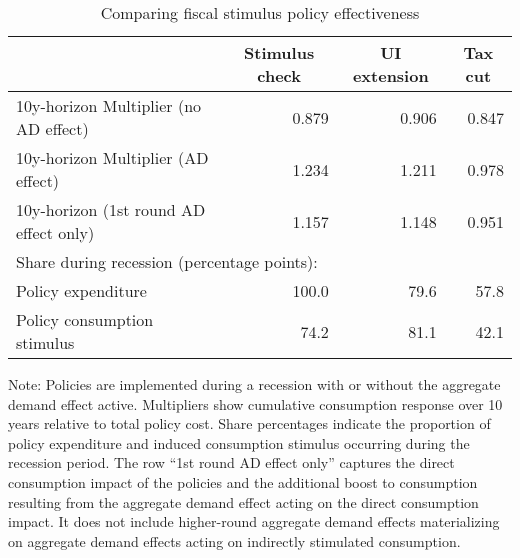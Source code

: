 \documentclass[\PathToRoot/\ProjectName]{subfiles}
\begin{document}
\begin{table}[tb] 
  \caption{Comparing fiscal stimulus policy effectiveness}
  \whenintegrated{\label{tab:Multiplier}} 
  \centering

  \begin{tabular*}
    {\textwidth}{@{\extracolsep{\fill}}lrrr@{}} 
    \hline
    & \multicolumn{1}{c}{Stimulus check} & \multicolumn{1}{c}{UI extension} & \multicolumn{1}{c}{Tax cut} \\ \hline
    10y-horizon Multiplier (no AD effect)      & 0.879 & 0.906 & 0.847 \\
    10y-horizon Multiplier (AD effect)         & 1.234 & 1.211 & 0.978 \\
    10y-horizon (1st round AD effect only)     & 1.157 & 1.148 & 0.951 \\
    \hline
    \multicolumn{4}{l}{Share during recession (percentage points):} \\
    Policy expenditure                          & 100.0 &  79.6 &  57.8 \\
    Policy consumption stimulus                 &  74.2 &  81.1 &  42.1 \\
    \hline
  \end{tabular*}

  \noindent\parbox{\textwidth}{
    \medskip
    \footnotesize Note: Policies are implemented during a recession with or without the aggregate demand effect active. Multipliers show cumulative consumption response over 10 years relative to total policy cost. Share percentages indicate the proportion of policy expenditure and induced consumption stimulus occurring during the recession period. The row ``1st round AD effect only'' captures the direct consumption impact of the policies and the additional boost to consumption resulting from the aggregate demand effect acting on the direct consumption impact. It does not include higher-round aggregate demand effects materializing on aggregate demand effects acting on indirectly stimulated consumption.
  }
\end{table}

\vspace{0.5em}
\end{document}

